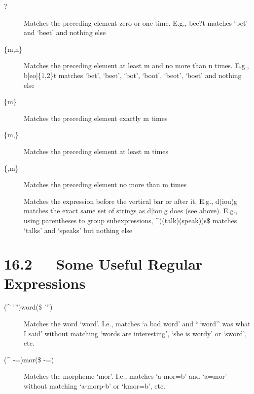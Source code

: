 \documentclass[letterpaper,10pt,english]{sphinxmanual}
\begin{document}
\begin{description}
\item[{?}] \leavevmode
Matches the preceding element zero or one time.  E.g., bee?t matches `bet'
and `beet' and nothing else

\item[{\{m,n\}}] \leavevmode
Matches the preceding element at least m and no more than n times.  E.g.,
b{[}eo{]}\{1,2\}t matches `bet', `beet', `bot', `boot', `beot', `boet' and nothing
else

\item[{\{m\}}] \leavevmode
Matches the preceding element exactly m times

\item[{\{m,\}}] \leavevmode
Matches the preceding element at least m times

\item[{\{,m\}}] \leavevmode
Matches the preceding element no more than m times

\item[{\textbar{}}] \leavevmode
Matches the expression before the vertical bar or after it.  E.g., d(i\textbar{}o\textbar{}u)g
matches the exact same set of strings as d{[}iou{]}g does (see above).  E.g.,
using parentheses to group subexpressions, \textasciicircum{}((talk)\textbar{}(speak))s\$ matches
`talks' and `speaks' but nothing else

\end{description}


\section{16.2   Some Useful Regular Expressions}
\label{user_guide:some-useful-regular-expressions}\begin{description}
\item[{(\textasciicircum{}\textbar{} \textbar{}'\textbar{}'')word(\$\textbar{} \textbar{}'\textbar{}'')}] \leavevmode
Matches the word `word'.  I.e., matches `a bad word' and ```word'' was what
I said' without matching `words are interesting', `she is wordy' or
`sword', etc.

\item[{(\textasciicircum{}\textbar{} \textbar{}-\textbar{}=)mor(\$\textbar{} \textbar{}-\textbar{}=)}] \leavevmode
Matches the morpheme `mor'.  I.e., matches `a-mor=b' and `a=mor' without
matching `a-morp-b' or `kmor=b', etc.

\end{description}
\end{document}
